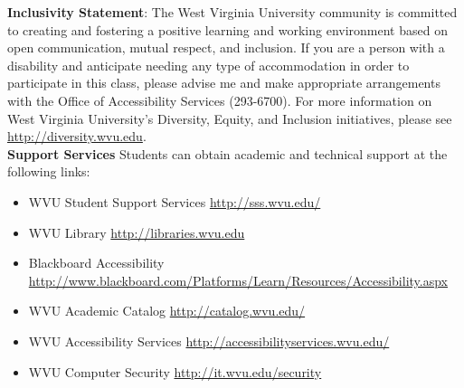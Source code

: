 \documentclass[10pt]{article}
\begin{document}
\textbf{Inclusivity Statement}:
The West Virginia University community is committed to creating and
fostering a positive learning and working environment based on open
communication, mutual respect, and inclusion. If you are a person with
a disability and anticipate needing any type of accommodation in order
to participate in this class, please advise me and make appropriate
arrangements with the Office of Accessibility Services (293-6700). For
more information on West Virginia University’s Diversity, Equity, and
Inclusion initiatives, please see \url{http://diversity.wvu.edu}.\\

\textbf{Support Services}
Students can obtain academic and technical support at the following links:
\begin{itemize}
    \item WVU Student Support Services \url{http://sss.wvu.edu/}
    \item WVU Library \url{http://libraries.wvu.edu}
    \item Blackboard Accessibility
      \url{http://www.blackboard.com/Platforms/Learn/Resources/Accessibility.aspx }
    \item WVU Academic Catalog \url{http://catalog.wvu.edu/}
    \item WVU Accessibility Services \url{http://accessibilityservices.wvu.edu/}
    \item WVU Computer Security \url{http://it.wvu.edu/security}
\end{itemize}


\end{document}
